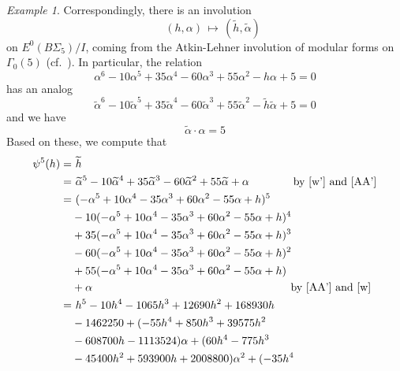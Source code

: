 \documentclass{gtpart}
\theoremstyle{definition}
\theoremstyle{remark}
\newtheorem{ex}[equation]{Example}
\newcommand{\A}{\alpha}
\newcommand{\G}{\Gamma}
\renewcommand{\=}{\approx}
\renewcommand{\-}{\sim}
\numberwithin{equation}{section}
\begin{document}
\begin{ex}
 Correspondingly, there is an involution 
 \[
  \quad~~ (h, \A) \, \mapsto \, (\widetilde{h}, \widetilde{\A}) 
 \]
 on $E^0(B\Sigma_5) / I$, coming from the Atkin-Lehner involution of modular 
 forms on $\G_0(5)$ (cf.~\cite[Lemmas 7--10]{AtkinLehner}).  In particular, the 
 relation 
 \begin{equation}
  \label{w}
  \A^6 - 10 \A^5 + 35 \A^4 - 60 \A^3 + 55 \A^2 - h \A + 5 = 0 
 \end{equation}
 has an analog 
 \begin{equation}
  \label{w'}
  \widetilde{\A}^6 - 10 \widetilde{\A}^5 + 35 \widetilde{\A}^4 
  - 60 \widetilde{\A}^3 + 55 \widetilde{\A}^2 - \widetilde{h} \widetilde{\A} + 5 
  = 0 
 \end{equation}
 and we have 
 \begin{equation}
  \label{AA'}
  \widetilde{\A} \cdot \A = 5 
 \end{equation}
 Based on these, we compute that 
 \begin{equation}
  \label{psi5}
  \begin{split}
   \psi^5(h) = & ~ \widetilde{h} \\
             = & ~ \widetilde{\A}^5 - 10 \widetilde{\A}^4 + 35 \widetilde{\A}^3 
                 - 60 \widetilde{\A}^2 + 55 \widetilde{\A} + \A 
                 \qquad\qquad \text{by \eqref{w'} and \eqref{AA'}} \\
             = & ~ (-\A^5 + 10 \A^4 - 35 \A^3 + 60 \A^2 - 55 \A + h)^5 \\
               & - 10 (-\A^5 + 10 \A^4 - 35 \A^3 + 60 \A^2 - 55 \A + h)^4 \\
               & + 35 (-\A^5 + 10 \A^4 - 35 \A^3 + 60 \A^2 - 55 \A + h)^3 \\
               & - 60 (-\A^5 + 10 \A^4 - 35 \A^3 + 60 \A^2 - 55 \A + h)^2 \\
               & + 55 (-\A^5 + 10 \A^4 - 35 \A^3 + 60 \A^2 - 55 \A + h) \\
               & + \A 
                 \qquad\qquad\qquad\qquad\qquad\qquad\qquad\qquad\qquad 
                 \text{by \eqref{AA'} and \eqref{w}} \\
             = & ~ h^5 - 10 h^4 - 1065 h^3 + 12690 h^2 + 168930 h \\
               & - 1462250 + (-55 h^4 + 850 h^3 + 39575 h^2 \\
               & - 608700 h - 1113524) \A + (60 h^4 - 775 h^3 \\
               & - 45400 h^2 + 593900 h + 2008800) \A^2 + (-35 h^4 \\

\end{split}
\end{equation}
\end{ex}
\end{document}
